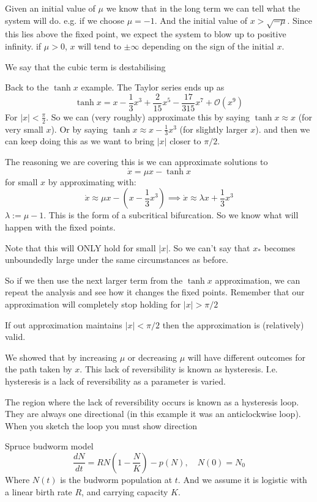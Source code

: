 \documentclass{X:/Documents/Coding/Latex/myassignment}
\begin{document}
Given an initial value of $\mu$ we know that in the long term we can tell what the system will do. e.g. if we choose $\mu = -1$. And the initial value of $x > \sqrt{-\mu}$. Since this lies above the fixed point, we expect the system to blow up to positive infinity. if $\mu > 0$, $x$ will tend to $\pm \infty$ depending on the sign of the initial $x$.

We say that the cubic term is destabilising

Back to the $\tanh x$ example. The Taylor series ends up as
\[\tanh x = x - \frac13 x^3 + \frac2{15} x^5 - \frac{17}{315} x^7 + \mathcal{O}(x^9)\]
For $|x| < \frac{\pi}{2}$.
So we can (very roughly) approximate this by saying $\tanh x \approx x$ (for very small $x$). Or by saying
$\tanh x \approx x - \frac13 x^3$ (for slightly larger $x$). and then we can keep doing this as we want to bring $|x|$ closer to $\pi/2$.

The reasoning we are covering this is we can approximate solutions to
\[\dot{x} = \mu x - \tanh x\]
for small $x$ by approximating with:
\[\dot{x} \approx \mu x - (x - \frac13 x^3) \implies \dot{x} \approx \lambda x + \frac13 x^3\]
$\lambda := \mu -1$. This is the form of a subcritical bifurcation. So we know what will happen with the fixed points. 

Note that this will ONLY hold for small $|x|$. So we can't say that $x_*$ becomes unboundedly large under the same circumstances as before.

So if we then use the next larger term from the $\tanh x$ approximation, we can repeat the analysis and see how it changes the fixed points.
Remember that our approximation will completely stop holding for $|x| > \pi/2$

If out approximation maintains $|x| < \pi /2$ then the approximation is (relatively) valid.


We showed that by increasing $\mu$ or decreasing $\mu$ will have different outcomes for the path taken by $x$. This lack of reversibility is known as hysteresis. I.e. hysteresis is a lack of reversibility as a parameter is varied.



The region where the lack of reversibility occurs is known as a hysteresis loop. They are always one directional (in this example it was an anticlockwise loop). When you sketch the loop you must show direction


Spruce budworm model
\[\frac{dN}{dt} = RN(1 - \frac{N}{K}) - p(N), \quad N(0) = N_0\]
Where $N(t)$ is the budworm population at $t$. And we assume it is logistic with a linear birth rate $R$, and carrying capacity $K$.
\end{document}
